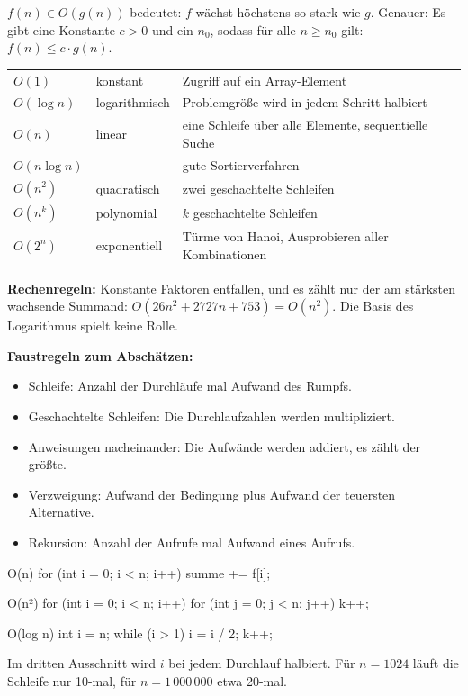 \begin{merke}[O-Notation]
$f(n) \in O(g(n))$ bedeutet: $f$ wächst höchstens so stark wie $g$. Genauer: Es gibt eine Konstante $c > 0$ und ein $n_0$, sodass für alle $n \geq n_0$ gilt: $f(n) \leq c \cdot g(n)$.

\smallskip
\begin{tabular}{@{}lll@{}}
$O(1)$ & konstant & Zugriff auf ein Array-Element \\
$O(\log n)$ & logarithmisch & Problemgröße wird in jedem Schritt halbiert \\
$O(n)$ & linear & eine Schleife über alle Elemente, sequentielle Suche \\
$O(n \log n)$ & & gute Sortierverfahren \\
$O(n^2)$ & quadratisch & zwei geschachtelte Schleifen \\
$O(n^k)$ & polynomial & $k$ geschachtelte Schleifen \\
$O(2^n)$ & exponentiell & Türme von Hanoi, Ausprobieren aller Kombinationen
\end{tabular}

\smallskip
\textbf{Rechenregeln:} Konstante Faktoren entfallen, und es zählt nur der am stärksten wachsende Summand: $O(26n^2 + 2727n + 753) = O(n^2)$. Die Basis des Logarithmus spielt keine Rolle.

\smallskip
\textbf{Faustregeln zum Abschätzen:}
\begin{itemize}[itemsep=0.1em]
\item Schleife: Anzahl der Durchläufe mal Aufwand des Rumpfs.
\item Geschachtelte Schleifen: Die Durchlaufzahlen werden multipliziert.
\item Anweisungen nacheinander: Die Aufwände werden addiert, es zählt der größte.
\item Verzweigung: Aufwand der Bedingung plus Aufwand der teuersten Alternative.
\item Rekursion: Anzahl der Aufrufe mal Aufwand eines Aufrufs.
\end{itemize}
\end{merke}

\beispiele
{}
\begin{tcbraster}[raster columns=3, raster equal height, raster column skip=3mm]
\begin{javacode}[Ausschnitt]{O(n)}
for (int i = 0; i < n; i++) {
	summe += f[i];
}
\end{javacode}
\begin{javacode}[Ausschnitt]{O(n²)}
for (int i = 0; i < n; i++) {
	for (int j = 0; j < n; j++) {
		k++;
	}
}
\end{javacode}
\begin{javacode}[Ausschnitt]{O(log n)}
int i = n;
while (i > 1) {
	i = i / 2;
	k++;
}
\end{javacode}
\end{tcbraster}
Im dritten Ausschnitt wird $i$ bei jedem Durchlauf halbiert. Für $n = 1024$ läuft die Schleife nur 10-mal, für $n = 1\,000\,000$ etwa 20-mal.

